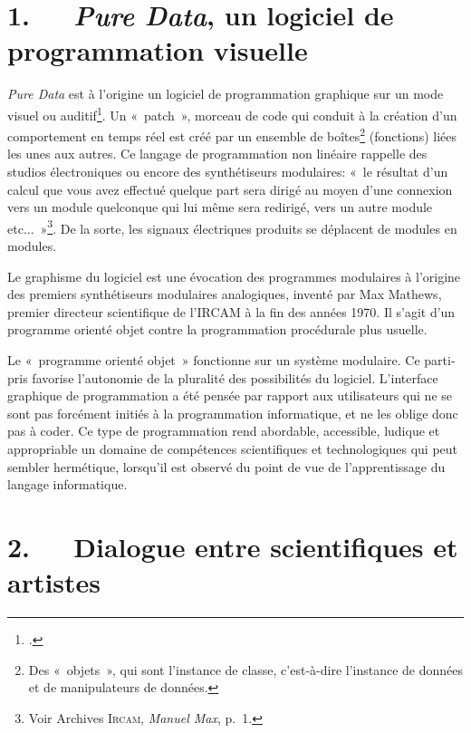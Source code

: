 \documentclass{FramateX}
\begin{document}
\begin{refsection}
\section*{1.~~~\textit{Pure Data}, un logiciel de programmation visuelle}
{}

\textit{Pure Data} est à l'origine un logiciel de programmation graphique sur un
mode visuel ou auditif\footnote{\cite[p.~21]{Pachet2004}.}. Un «~patch~», morceau de code qui
conduit à la création d'un comportement en temps réel est créé par un
ensemble de boîtes\footnote{Des «~objets~», qui sont l'instance de
classe, c'est-à-dire l'instance de données et de manipulateurs de
données.} (fonctions) liées les unes aux autres. Ce langage de
programmation non linéaire rappelle des studios électroniques ou encore
des synthétiseurs modulaires: «~le résultat d'un calcul que vous avez
effectué quelque part sera dirigé au moyen d'une connexion vers un
module quelconque qui lui même sera redirigé, vers un autre module
etc...~»\footnote{Voir Archives \textsc{Ircam}, \textit{Manuel Max}, p.~1.}. De la sorte,
les signaux électriques produits se déplacent de modules en modules. 

Le graphisme du logiciel est une évocation des programmes modulaires à
l'origine des premiers synthétiseurs modulaires analogiques, inventé
par Max Mathews, premier directeur scientifique de l'IRCAM à la fin des
années 1970. Il s'agit d'un programme orienté objet
contre la programmation procédurale plus usuelle. 

Le «~programme orienté objet~» fonctionne sur un système modulaire. Ce
parti-pris favorise l'autonomie de la pluralité des possibilités du
logiciel. L'interface graphique de programmation a été
pensée par rapport aux utilisateurs qui ne se sont pas forcément
initiés à la programmation informatique, et ne les oblige donc pas à
coder. Ce type de programmation rend abordable, accessible, ludique et
appropriable un domaine de compétences scientifiques et technologiques
qui peut sembler hermétique, lorsqu'il est observé du point de vue de
l'apprentissage du langage informatique.

\section*{2.~~~Dialogue entre scientifiques et artistes}
{}


\end{refsection}
\end{document}
